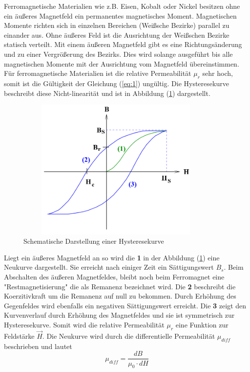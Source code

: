 Ferromagnetische Materialien wie z.B. Eisen, Kobalt oder Nickel besitzen ohne ein äußeres Magnetfeld
ein permanentes magnetisches Moment. Magnetischen Momente richten sich in einzelnen Bereichen (Weißsche Bezirke)
parallel zu einander aus. Ohne äußeres Feld ist die Ausrichtung der Weißschen Bezirke statisch verteilt.
Mit einem äußeren Magnetfeld gibt es eine Richtungsänderung und zu einer Vergrößerung des Bezirks.
Dies wird solange ausgeführt bis alle magnetischen Momente mit der Ausrichtung vom Magnetfeld übereinstimmen.
Für ferromagnetische Materialien ist die relative Permeabilität $\mu_r$ sehr hoch, somit ist die Gültigkeit der
Gleichung (\ref{eq:1}) ungültig.
Die Hysteresekurve beschreibt diese Nicht-linearität und ist in Abbildung (\ref{abb:3}) dargestellt.
\begin{figure}[H]
  \centering
  \includegraphics[width=10cm, height= 7cm]{Abb3.png}
  \caption{Schematische Darstellung einer Hysteresekurve}
  \label{abb:3}
\end{figure}
Liegt ein äußeres Magnetfeld an so wird die \textbf{1} in der Abbildung (\ref{abb:3}) eine
Neukurve dargestellt. Sie erreicht nach einiger Zeit ein Sättigungswert $B_s$. Beim Abschalten
des äußeren Magnetfeldes, bleibt noch beim Ferromagnet eine "Restmagnetisierung" die
als Remanenz bezeichnet wird. Die \textbf{2} beschreibt die Koerzitivkraft um die Remanenz auf null zu bekommen.
Durch Erhöhung des Gegenfeldes wird ebenfalls ein negativen Sättigungswert erreicht.
Die \textbf{3} zeigt den Kurvenverlauf durch Erhöhung des Magnetfeldes und sie ist symmetrisch zur Hysteresekurve.
Somit wird die relative Permeabilität $\mu_r$ eine Funktion zur Feldstärke $\vec{H}$.
Die Neukurve wird durch die differentielle Permeabilität $\mu_{diff}$ beschrieben und lautet 
\begin{equation*}
  \mu_{diff} = \frac{dB}{\mu_0 \cdot dH}
  \label{eq:6}
\end{equation*}
